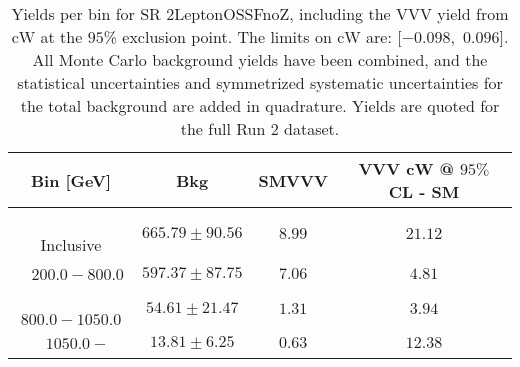 \begin{table}[!htbp]
    \small
    \center
    \begin{tabular}{c||c|c|c}
    Bin [GeV] & Bkg & SMVVV & \pbox{20cm}{VVV \\ cW @ $95\%$ CL - SM \\ }\\
    \hline
    \pbox{20cm}{ ~ \\Inclusive\\ } & $665.79 \pm 90.56$ & $8.99$ & $21.12$\\
    \hline
    \pbox{20cm}{ ~ \\$200.0-800.0$\\ } & $597.37 \pm 87.75$ & $7.06$ & $4.81$\\
    \hline
    \pbox{20cm}{ ~ \\$800.0-1050.0$\\ } & $54.61 \pm 21.47$ & $1.31$ & $3.94$\\
    \hline
    \pbox{20cm}{ ~ \\$1050.0-$\\ } & $13.81 \pm 6.25$ & $0.63$ & $12.38$\\
\end{tabular}
    \caption{Yields per bin for SR 2LeptonOSSFnoZ, including the VVV yield from cW at the $95$\% exclusion point. The limits on cW are: [$-0.098$,~$0.096$]. All Monte Carlo background yields have been combined, and the statistical uncertainties and symmetrized systematic uncertainties for the total background are added in quadrature. Yields are quoted for the full Run 2 dataset.}
    \label{tab:2LeptonOSSFnoZ$binssignal}
\end{table}
